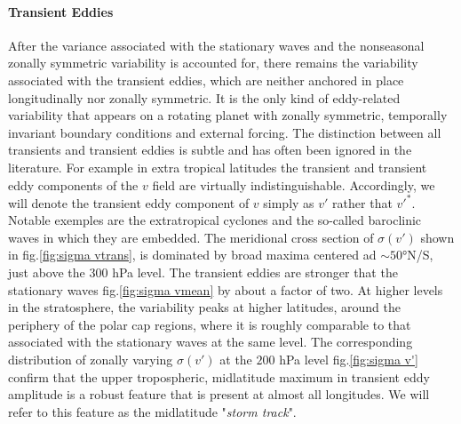 \paragraph{Transient Eddies}
After the variance associated with the stationary waves and the nonseasonal zonally symmetric variability is accounted for, there remains the variability associated with the transient eddies, which are neither anchored in place longitudinally nor zonally symmetric. It is the only kind of eddy-related variability that appears on a rotating planet with zonally symmetric, temporally invariant boundary conditions and external forcing. The distinction between all transients and transient eddies is subtle and has often been ignored in the literature. For example in extra tropical latitudes the transient and transient eddy components of the $v$ field are virtually indistinguishable. Accordingly, we will denote the transient eddy component of $v$ simply as $v'$ rather that $v'^*$. Notable exemples are the extratropical cyclones and the so-called baroclinic waves in which they are embedded. The meridional cross section of $\sigma(v')$ shown in fig.\ref{fig:sigma vtrans}, is dominated by broad maxima centered ad $\sim 50$°N/S, just above the $300$ hPa level. The transient eddies are stronger that the stationary waves fig.\ref{fig:sigma vmean} by about a factor of two. At higher levels in the stratosphere, the variability peaks at higher latitudes, around the periphery of the polar cap regions, where it is roughly comparable to that associated with the stationary waves at the same level. The corresponding distribution of zonally varying $\sigma(v')$ at the $200$ hPa level fig.\ref{fig:sigma v'} confirm that the upper tropospheric, midlatitude maximum in transient eddy amplitude is a robust feature that is present at almost all longitudes. We will refer to this feature as the midlatitude "\emph{storm track}". 
